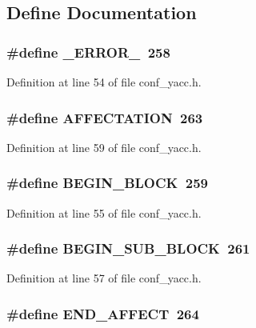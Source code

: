 \subsection{Define Documentation}
\subsubsection[{\_\-ERROR\_\-}]{\setlength{\rightskip}{0pt plus 5cm}\#define \_\-ERROR\_\-~258}\label{conf__yacc_8h_a4d178ec5f52534c3fcc7b775e0d45dca}


Definition at line 54 of file conf\_\-yacc.h.
\subsubsection[{AFFECTATION}]{\setlength{\rightskip}{0pt plus 5cm}\#define AFFECTATION~263}\label{conf__yacc_8h_a022df7a30fcaef01eebfb88950340e5f}


Definition at line 59 of file conf\_\-yacc.h.
\subsubsection[{BEGIN\_\-BLOCK}]{\setlength{\rightskip}{0pt plus 5cm}\#define BEGIN\_\-BLOCK~259}\label{conf__yacc_8h_a0cfed3166e84c638e5e9fa1699a80ef9}


Definition at line 55 of file conf\_\-yacc.h.
\subsubsection[{BEGIN\_\-SUB\_\-BLOCK}]{\setlength{\rightskip}{0pt plus 5cm}\#define BEGIN\_\-SUB\_\-BLOCK~261}\label{conf__yacc_8h_a58b355915dd539386d8e0b3b7a01ecf5}


Definition at line 57 of file conf\_\-yacc.h.
\subsubsection[{END\_\-AFFECT}]{\setlength{\rightskip}{0pt plus 5cm}\#define END\_\-AFFECT~264}\label{conf__yacc_8h_a118bfcf86c66a3e14247675e6eb0e336}


